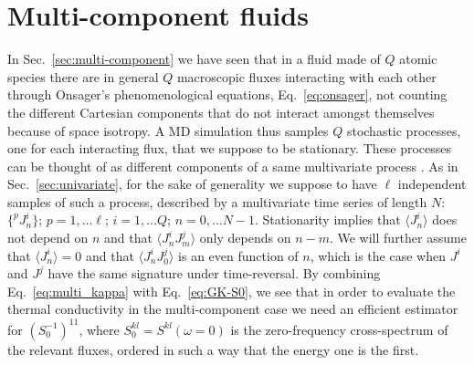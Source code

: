 \section{Multi-component fluids}
In Sec.~\ref{sec:multi-component} we have seen that in a fluid made of $Q$ atomic species there are in general $Q$ macroscopic fluxes interacting with each other through Onsager's phenomenological equations, Eq.~\eqref{eq:onsager}, not counting the different Cartesian components that do not interact amongst themselves because of space isotropy. A MD simulation thus samples $Q$ stochastic processes, one for each interacting flux, that we suppose to be stationary. These processes can be thought of as different components of a same multivariate process \citep{Bertossa2018}. As in Sec.~\ref{sec:univariate}, for the sake of generality we suppose to have $\ell$ independent samples of such a process, described by a multivariate time series of length $N$: $\{ ^{p\!}{J}^i_n \}$; $p=1,\dots \ell$; $i=1,\dots Q$; $n=0,\dots N-1$. Stationarity implies that $\langle {J}^i_n\rangle $ does not depend on $n$ and that $\langle {J}^i_n {J}^j_m \rangle$ only depends on $n-m$. We will further assume that $\langle {J}^i_n\rangle =0 $ and that $\langle {J}^i_n {J}^j_0 \rangle$ is an even function of $n$, which is the case when ${J}^i$ and ${J}^j$ have the same signature under time-reversal. By combining Eq.~\eqref{eq:multi_kappa} with Eq.~\eqref{eq:GK-S0}, we see that in order to evaluate the thermal conductivity in the multi-component case we need an efficient estimator for $\left ( S^{-1}_0\right )^{11}$, where $S^{kl}_0=S^{kl}(\omega=0)$ is the zero-frequency cross-spectrum of the relevant fluxes, ordered in  such a way that the energy one is the first.

